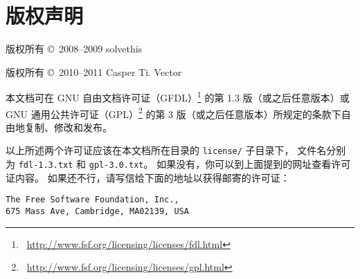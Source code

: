 \cleardoublepage
\chapter*{\textbf{版权声明}}
{

\iffalse
	任何收存和保管本论文各种版本的单位和个人，
	未经本论文作者同意，不得将本论文转借他人，
	亦不得随意复制、抄录、拍照或以任何方式传播。
	否则一旦引起有碍作者著作权之问题，将可能承担法律责任。
\fi

	版权所有 \copyright\ 2008--2009 solvethis
	\par
	版权所有 \copyright\ 2010--2011 Casper Ti. Vector
	\vspace{0.75em}\par
	本文档可在 GNU 自由文档许可证（GFDL）\footnote%
	{\ \url{http://www.fsf.org/licensing/licenses/fdl.html}}%
	的第 1.3 版（或之后任意版本）或 GNU 通用公共许可证（GPL）\footnote%
	{\ \url{http://www.fsf.org/licensing/licenses/gpl.html}}%
	的第 3 版（或之后任意版本）所规定的条款下自由地复制、修改和发布。
	
	以上所述两个许可证应该在本文档所在目录的 \verb|license/| 子目录下，
	文件名分别为 \verb|fdl-1.3.txt| 和 \verb|gpl-3.0.txt|。
	如果没有，你可以到上面提到的网址查看许可证内容。
	如果还不行，请写信给下面的地址以获得邮寄的许可证：
\begin{Verbatim}
The Free Software Foundation, Inc.,
675 Mass Ave, Cambridge, MA02139, USA 
\end{Verbatim}
	\par
}

